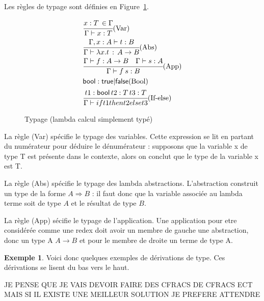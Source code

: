 \documentclass {article}
\theoremstyle{definition}
\newtheorem{example}{Exemple}
\theoremstyle{remark}
\begin{document}
Les règles de typage sont définies en Figure~\ref{fig:typage-simple}.

\begin{figure}

\begin{align*}
&  \cfrac{x:T\,\in\Gamma}
         {\Gamma\vdash x:T}\mbox{(Var)} 
  \\
&  \cfrac{\Gamma, x:A \vdash t:B}
         {\Gamma \vdash \lambda x. t \,:\, A\rightarrow B}\mbox{(Abs)} \\
&  \cfrac{\Gamma \vdash f : A\rightarrow B \quad
          \Gamma \vdash s : A}
         {\Gamma\vdash f\: s : B}\mbox{(App)} \\
&  \mathsf{bool}:\mathsf{true}|\mathsf{false}\mbox{(Bool)} \\
&  \cfrac{t1:\mathsf{bool}\,t2:T\,t3:T}
         {\Gamma\vdash if t1 then t2 else t3}\mbox{(If-else)} \\
\end{align*}

\caption{Typage (lambda calcul simplement typé)}
\label{fig:typage-simple}
\end{figure}   

La règle (Var) spécifie le typage des variables. Cette expression se
lit en partant du numérateur pour déduire le dénumérateur : supposons
que la variable x de type T est présente dans le contexte, alors on
conclut que le type de la variable x est T.

La règle (Abs) spécifie le typage des lambda
abstractions. L'abstraction construit un type de la forme \(A
\Rightarrow B\) : il faut donc que la variable associée au lambda
terme soit de type \(A\) et le résultat de type \(B\).

La règle (App) sécifie le typage de l'application. Une application pour etre 
considérée comme une redex doit avoir un membre de gauche une abstraction, 
donc un type A \(A\rightarrow B\) et pour le membre de droite un terme 
de type A. 

\begin{example}
  Voici donc quelques exemples de dérivations de type.
  Ces dérivations se lisent du bas vers le haut.
  
  
  JE PENSE QUE JE VAIS DEVOIR FAIRE DES CFRACS DE CFRACS ECT MAIS SI
  IL EXISTE UNE MEILLEUR SOLUTION JE PREFERE ATTENDRE
\end{example}
\end{document}
